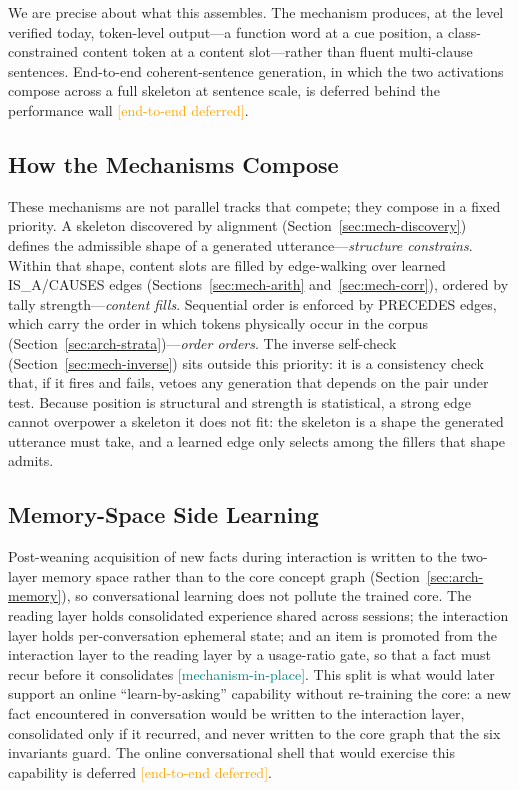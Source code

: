 \documentclass[11pt,a4paper]{article}
\newcommand{\statusmech}{\textcolor{teal}{\small\textsf{[mechanism-in-place]}}}
\newcommand{\statusdeferred}{\textcolor{orange}{\small\textsf{[end-to-end deferred]}}}
\begin{document}
We are precise about what this assembles. The mechanism produces, at the
level verified today, token-level output---a function word at a cue
position, a class-constrained content token at a content slot---rather
than fluent multi-clause sentences. End-to-end coherent-sentence
generation, in which the two activations compose across a full skeleton
at sentence scale, is deferred behind the performance wall
\statusdeferred.

\subsection{How the Mechanisms Compose}
\label{sec:mech-compose}
These mechanisms are not parallel tracks that compete; they compose in a
fixed priority. A skeleton discovered by alignment
(Section~\ref{sec:mech-discovery}) defines the admissible shape of a
generated utterance---\emph{structure constrains}. Within that shape,
content slots are filled by edge-walking over learned IS\_A/CAUSES edges
(Sections~\ref{sec:mech-arith} and~\ref{sec:mech-corr}), ordered by
tally strength---\emph{content fills}. Sequential order is enforced by
PRECEDES edges, which carry the order in which tokens physically occur
in the corpus (Section~\ref{sec:arch-strata})---\emph{order orders}.
The inverse self-check (Section~\ref{sec:mech-inverse}) sits outside
this priority: it is a consistency check that, if it fires and fails,
vetoes any generation that depends on the pair under test. Because
position is structural and strength is statistical, a strong edge cannot
overpower a skeleton it does not fit: the skeleton is a shape the
generated utterance must take, and a learned edge only selects among
the fillers that shape admits.

\subsection{Memory-Space Side Learning}
Post-weaning acquisition of new facts during interaction is written to
the two-layer memory space rather than to the core concept graph
(Section~\ref{sec:arch-memory}), so conversational learning does not
pollute the trained core. The reading layer holds consolidated
experience shared across sessions; the interaction layer holds
per-conversation ephemeral state; and an item is promoted from the
interaction layer to the reading layer by a usage-ratio gate, so that a
fact must recur before it consolidates \statusmech. This split is what
would later support an online ``learn-by-asking'' capability without
re-training the core: a new fact encountered in conversation would be
written to the interaction layer, consolidated only if it recurred, and
never written to the core graph that the six invariants guard. The
online conversational shell that would exercise this capability is
deferred \statusdeferred.
\end{document}

